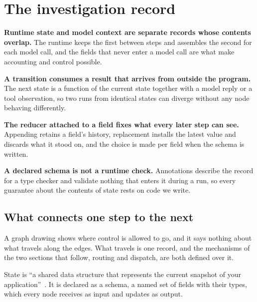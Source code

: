 \section{The investigation record}
\label{sec:state}

\begin{upshot}
\item \textbf{Runtime state and model context are separate records whose contents overlap.} The
  runtime keeps the first between steps and assembles the second for each model call, and the
  fields that never enter a model call are what make accounting and control possible.
\item \textbf{A transition consumes a result that arrives from outside the program.} The next
  state is a function of the current state together with a model reply or a tool observation, so
  two runs from identical states can diverge without any node behaving differently.
\item \textbf{The reducer attached to a field fixes what every later step can see.} Appending
  retains a field's history, replacement installs the latest value and discards what it stood on,
  and the choice is made per field when the schema is written.
\item \textbf{A declared schema is not a runtime check.} Annotations describe the record for a type
  checker and validate nothing that enters it during a run, so every guarantee about the contents
  of state rests on code we write.
\end{upshot}

\subsection{What connects one step to the next}
\label{sec:state-transition}

A graph drawing shows where control is allowed to go, and it says nothing about what travels along
the edges. What travels is one record, and the mechanisms of the two sections that follow, routing
and dispatch, are both defined over it.

\begin{definition}
\label{def:state}
State is ``a shared data structure that represents the current snapshot of your
application''~\citep{langgraph-graph-api}. It is declared as a schema, a named set of fields with
their types, which every node receives as input and updates as output.
\end{definition}

